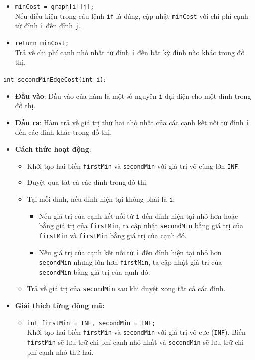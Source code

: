 \documentclass[a4paper]{article}
\begin{document}
\begin{itemize}
\begin{itemize}
\begin{itemize}
        \item \texttt{minCost = graph[i][j];} \\
        Nếu điều kiện trong câu lệnh \texttt{if} là đúng, cập nhật \texttt{minCost} với chi phí cạnh từ đỉnh \texttt{i} đến đỉnh \texttt{j}.

        \item \texttt{return minCost;} \\
        Trả về chi phí cạnh nhỏ nhất từ đỉnh \texttt{i} đến bất kỳ đỉnh nào khác trong đồ thị.
    \end{itemize}
\end{itemize}
\texttt{int secondMinEdgeCost(int i)}:
\begin{itemize}
\item \textbf{Đầu vào}: Đầu vào của hàm là một số nguyên \texttt{i} đại diện cho một đỉnh trong đồ thị.
\item \textbf{Đầu ra}: Hàm trả về giá trị thứ hai nhỏ nhất của các cạnh kết nối từ đỉnh \texttt{i} đến các đỉnh khác trong đồ thị.
\item \textbf{Cách thức hoạt động}:
\begin{itemize}
\item Khởi tạo hai biến \texttt{firstMin} và \texttt{secondMin} với giá trị vô cùng lớn \texttt{INF}.
\item Duyệt qua tất cả các đỉnh trong đồ thị.
\item Tại mỗi đỉnh, nếu đỉnh hiện tại không phải là \texttt{i}:
\begin{itemize}
\item Nếu giá trị của cạnh kết nối từ \texttt{i} đến đỉnh hiện tại nhỏ hơn hoặc bằng giá trị của \texttt{firstMin}, ta cập nhật \texttt{secondMin} bằng giá trị của \texttt{firstMin} và \texttt{firstMin} bằng giá trị của cạnh đó.
\item Nếu giá trị của cạnh kết nối từ \texttt{i} đến đỉnh hiện tại nhỏ hơn \texttt{secondMin} nhưng lớn hơn \texttt{firstMin}, ta cập nhật giá trị của \texttt{secondMin} bằng giá trị của cạnh đó.
\end{itemize}
\item Trả về giá trị của \texttt{secondMin} sau khi duyệt xong tất cả các đỉnh.
\end{itemize}
\end{itemize}

\begin{itemize}
    \item \textbf{Giải thích từng dòng mã:}
    \begin{itemize}
        \item \texttt{int firstMin = INF, secondMin = INF;} \\
        Khởi tạo hai biến \texttt{firstMin} và \texttt{secondMin} với giá trị vô cực (\texttt{INF}). Biến \texttt{firstMin} sẽ lưu trữ chi phí cạnh nhỏ nhất và \texttt{secondMin} sẽ lưu trữ chi phí cạnh nhỏ thứ hai.


\end{itemize}
\end{itemize}
\end{itemize}
\end{document}
